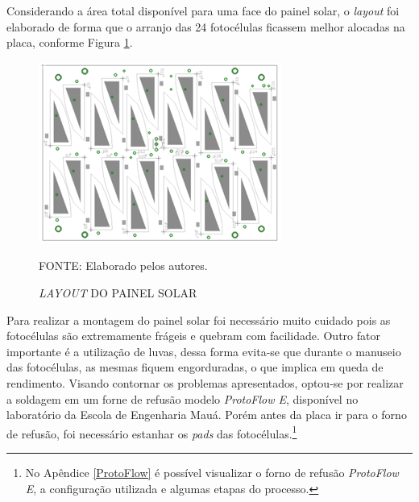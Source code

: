 \documentclass[
	12pt,				%
	openright,			%
	oneside,			%
	a4paper,			%
	english,			%
	french,				%
	spanish,			%
	brazil,				%
	oldfontcommands
	]{abntex2}
\begin{document}
	Considerando a área total disponível para uma face do painel solar, o \textit{layout} foi elaborado de forma que o arranjo das 24 fotocélulas ficassem melhor alocadas na placa, conforme Figura \ref{Fig_layout_cell}.
	
	\begin{figure}[th]
		\caption{\textit{LAYOUT} DO PAINEL SOLAR}
		\label{Fig_layout_cell}
		\centering
		\includegraphics[width=0.6\linewidth]{./figs/layout_cell}
			
		\begin{small}
			FONTE: Elaborado pelos autores.
		\end{small}
	\end{figure}
	
	Para realizar a montagem do painel solar foi necessário muito cuidado pois as fotocélulas são extremamente frágeis e quebram com facilidade. Outro fator importante é a utilização de luvas, dessa forma evita-se que durante o manuseio das fotocélulas, as mesmas fiquem engorduradas, o que implica em queda de rendimento. Visando contornar os problemas apresentados, optou-se por realizar a soldagem em um forne de refusão modelo \textit{ProtoFlow E}, disponível no laboratório da Escola de Engenharia Mauá. Porém antes da placa ir para o forno de refusão, foi necessário estanhar os \textit{pads} das fotocélulas.\footnote{No Apêndice \ref{ProtoFlow} é possível visualizar o forno de refusão \textit{ProtoFlow E}, a configuração utilizada e algumas etapas do processo.}
\end{document}

